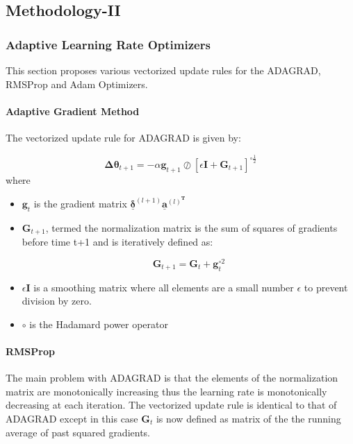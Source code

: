 \documentclass{article}
\begin{document}
\subsection{Methodology-II}

\subsubsection{Adaptive Learning Rate Optimizers}
This section proposes various vectorized update rules for the ADAGRAD, RMSProp and Adam Optimizers. 
\paragraph{Adaptive Gradient Method}
The vectorized update rule for ADAGRAD is given by:

\begin{equation}
\boldsymbol{\Delta{\theta}}_{t+1} = -\alpha\boldsymbol{g}_{t+1}\oslash[\epsilon\boldsymbol{I} + \boldsymbol{G}_{t+1}]^{\circ\frac{1}{2}}
\end{equation} 
where 
\begin{itemize}
	\item $\boldsymbol{g}_t$ is the gradient matrix $\underline{\boldsymbol{\delta}}^{(l+1)}\underline{\boldsymbol{a}}^{(l)^{\boldsymbol{T}}}$
	
	\item $\boldsymbol{G}_{t+1}$, termed the normalization matrix is the sum of squares of gradients before time t+1 and is iteratively defined as:
	
	\begin{equation}
	\boldsymbol{G}_{t+1} = \boldsymbol{G}_{t} + \boldsymbol{g}_{t}^{\circ{2}}
	\end{equation} 
	
	\item $\epsilon\boldsymbol{I}$ is a smoothing matrix where all elements are a small number $\epsilon$ to prevent division by zero.
	
	\item $\circ$ is the Hadamard power operator
\end{itemize}



\paragraph{RMSProp}
The main problem with ADAGRAD is that the elements of the normalization matrix are monotonically increasing thus the learning rate is monotonically decreasing at each iteration.
The vectorized update rule is identical to that of ADAGRAD except in this case $\boldsymbol{G}_t$ is now defined as matrix of the the running average of past squared gradients.
\end{document}
